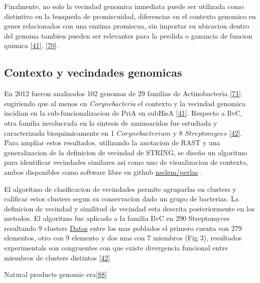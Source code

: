 \documentclass[12pt,twoside]{reedthesis}
\begin{document}
  Finalmente, no solo la vecindad genomica inmediata puede ser utilizada
  como distintivo en la busqueda de promiscuidad, diferencias en el
  contexto genomico en genes relacionados con una enzima promiscua, sin
  importar su ubicacion dentro del genoma tambien pueden ser relevantes
  para la perdida o ganancia de funcion quimica
  {[}\protect\hyperlink{ref-noda-garcia_evolution_2013}{41}{]},
  {[}\protect\hyperlink{ref-juarez-vazquez_evolution_2017}{70}{]}.
  
  \subsection{Contexto y vecindades
  genomicas}\label{contexto-y-vecindades-genomicas}
  
  En 2012 fueron analizados 102 genomas de 29 familias de Actinobacteria
  {[}\protect\hyperlink{ref-noda_tesis_2012}{71}{]}. sugiriendo que al
  menos en \emph{Corynebacteria} el contexto y la vecindad genomica
  incidian en la sub-funcionalizacion de PriA en subHisA
  {[}\protect\hyperlink{ref-noda-garcia_evolution_2013}{41}{]}. Respecto a
  IlvC, otra familia involucrada en la sintesis de aminoacidos fue
  estudiada y caracterizada bioquimicamente en 1 \(Corynebacterium\) y 8
  \(Streptomyces\)
  {[}\protect\hyperlink{ref-verdel-aranda_molecular_2015}{42}{]}. Para
  ampliar estos resultados, utilizando la anotacion de RAST y una
  generalizacion de la definicion de vecindad de STRING, se diseño un
  algoritmo para identificar vecindades similares asi como uno de
  visualizacion de contexto, ambos disponibles como software libre en
  github \href{https://github.com/nselem/perlas}{nselem/perlas} .
  
  El algoritmo de clasificacion de vecindades permite agruparlas en
  clusters y calificar estos clusters segun su conservacion dado un grupo
  de bacterias. La definicion de vecindad y similitud de vecindad esta
  descrita posteriormente en los metodos. El algoritmo fue aplicado a la
  familia IlvC en 290 Streptomyces resultando 9 clusters
  \href{http://148.247.230.43/nselem/CONTEXTS/REL_St275/ilvC/Contextos.php}{Datos}
  entre los mas poblados el primero cuenta con 279 elementos, otro con 9
  elemento y dos mas con 7 miembros (Fig 3), resultados experimentals son
  congruentes con que existe divergencia funcional entre miembros de
  clusters distintos
  {[}\protect\hyperlink{ref-verdel-aranda_molecular_2015}{42}{]}
  
  Natural products genomic
  era{[}\protect\hyperlink{ref-harvey_re-emergence_2015}{88}{]}
  
\end{document}
